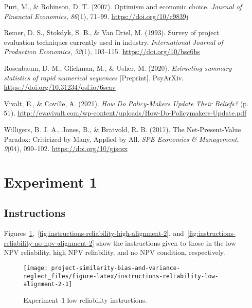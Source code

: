\documentclass[
  english,
  man, donotrepeattitle,floatsintext]{apa7}
\newlength{\cslhangindent}
\newenvironment{cslreferences}%
  {\setlength{\parindent}{0pt}%
  \everypar{\setlength{\hangindent}{\cslhangindent}}\ignorespaces}%
  {\par}
\theoremstyle{definition}
\theoremstyle{definition}
\theoremstyle{definition}
\theoremstyle{definition}
\theoremstyle{remark}
\begin{document}
\begin{cslreferences}
\leavevmode\hypertarget{ref-puri2007}{}%
Puri, M., \& Robinson, D. T. (2007). Optimism and economic choice. \emph{Journal of Financial Economics}, \emph{86}(1), 71--99. \url{https://doi.org/10/c9839j}

\leavevmode\hypertarget{ref-remer1993}{}%
Remer, D. S., Stokdyk, S. B., \& Van Driel, M. (1993). Survey of project evaluation techniques currently used in industry. \emph{International Journal of Production Economics}, \emph{32}(1), 103--115. \url{https://doi.org/10/bsc6bs}

\leavevmode\hypertarget{ref-rosenbaum2020}{}%
Rosenbaum, D. M., Glickman, M., \& Usher, M. (2020). \emph{Extracting summary statistics of rapid numerical sequences} {[}Preprint{]}. PsyArXiv. \url{https://doi.org/10.31234/osf.io/6scav}

\leavevmode\hypertarget{ref-vivalt2021}{}%
Vivalt, E., \& Coville, A. (2021). \emph{How Do Policy-Makers Update Their Beliefs?} (p. 51). \url{http://evavivalt.com/wp-content/uploads/How-Do-Policymakers-Update.pdf}

\leavevmode\hypertarget{ref-willigers2017}{}%
Willigers, B. J. A., Jones, B., \& Bratvold, R. B. (2017). The Net-Present-Value Paradox: Criticized by Many, Applied by All. \emph{SPE Economics \& Management}, \emph{9}(04), 090--102. \url{https://doi.org/10/gjscsx}
\end{cslreferences}

\endgroup

\hypertarget{appendix-appendix}{%
\appendix}


\hypertarget{alignment-2-appendix}{%
\section{Experiment 1}\label{alignment-2-appendix}}

\hypertarget{instructions-materials-alignment-2-appendix}{%
\subsection{Instructions}\label{instructions-materials-alignment-2-appendix}}

Figures~\ref{fig:instructions-reliability-low-alignment-2},~\ref{fig:instructions-reliability-high-alignment-2},
and~\ref{fig:instructions-reliability-no-npv-alignment-2} show the instructions
given to those in the low NPV reliability, high NPV reliability, and no NPV
condition, respectively.



\begin{figure}
\texttt{[image: project-similarity-bias-and-variance-neglect\_files/figure-latex/instructions-reliability-low-alignment-2-1]} \caption{Experiment~1 low reliability instructions.}\label{fig:instructions-reliability-low-alignment-2}
\end{figure}
\end{document}
